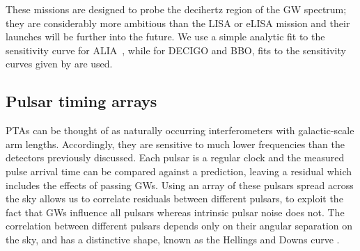 These missions are designed to probe the decihertz region of the GW spectrum; they are considerably more ambitious than the LISA or eLISA mission and their launches will be further into the future. We use a simple analytic fit to the sensitivity curve for ALIA~\citep{bender_possible_2013}, while for DECIGO and BBO, fits to the sensitivity curves given by \citet{2011PhRvD..83d4011Y} are used.

\subsection{Pulsar timing arrays}\label{sec:PTAgeneralproperties}

PTAs can be thought of as naturally occurring interferometers with galactic-scale arm lengths. Accordingly, they are sensitive to much lower frequencies than the detectors previously discussed. Each pulsar is a regular clock and the measured pulse arrival time can be compared against a prediction, leaving a residual which includes the effects of passing GWs. Using an array of these pulsars spread across the sky allows us to correlate residuals between different pulsars, to exploit the fact that GWs influence all pulsars whereas intrinsic pulsar noise does not. The correlation between different pulsars depends only on their angular separation on the sky, and has a distinctive shape, known as the Hellings and Downs curve \citep{HellingsDowns}.

